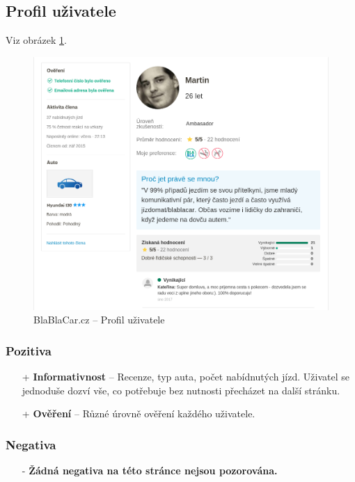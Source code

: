 
\newpage
\subsection{Profil uživatele}
Viz obrázek \ref{fig:blablacar:profile}.
\begin{figure}[h]
    \centering
    \includegraphics[width=1.0\textwidth]{media/blablacar/profile.png}
    \caption{BlaBlaCar.cz -- Profil uživatele}
    \label{fig:blablacar:profile}
\end{figure}
\subsubsection*{Pozitiva}
\begin{itemize}
    \item[+] \textbf{Informativnost} -- Recenze, typ auta, počet nabídnutých jízd. Uživatel se jednoduše dozví vše, co potřebuje bez nutnosti přecházet na další stránku.
    \item[+] \textbf{Ověření} -- Různé úrovně ověření každého uživatele.
\end{itemize}
\subsubsection*{Negativa}
\begin{itemize}
    \item[-] \textbf{Žádná negativa na této stránce nejsou pozorována.}
\end{itemize}


